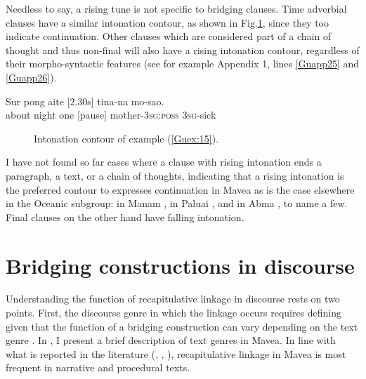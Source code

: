\documentclass[output=paper]{LSP/langsci}
\begin{document}
Needless to say, a rising tune is not specific to bridging clauses. Time adverbial clauses have a similar intonation contour, as shown in Fig.\ref{GuF5}, since they too indicate continuation. Other clauses which are considered part of a chain of thought and thus non-final will also have a rising intonation contour, regardless of their morpho-syntactic features (see for example Appendix 1, lines \ref{Guapp25} and \ref{Guapp26}). 

\begin{exe}
\ex \label{Guex:15}
\gll Sur     pong  aite [2.30s]   tina-na                mo-sao.\\     	       
about   night one      [pause]   mother-\textsc{3sg:poss}   \textsc{3sg}-sick \\
\glt {} 
\end{exe}


\begin{figure}[ht]
\caption{Intonation contour of example (\ref{Guex:15}). \label{GuF5}}
\end{figure}

I have not found so far cases where a clause with rising intonation ends a paragraph, a text, or a chain of thoughts, indicating that a rising intonation is the preferred contour to expresses continuation in Mavea as is the case elsewhere in the Oceanic subgroup: in Manam \citep[][521]{Lichtenberk83}, in Paluai \citep[][63]{Schokkin13}, and in Abma \citep[][38]{Schneider10}, to name a few. Final clauses on the other hand have falling intonation. 


\section{Bridging constructions in discourse} 
\label{Gusec:Understanding}
Understanding the function of recapitulative linkage in discourse rests on two points. First, the discourse genre in which the linkage occurs requires defining given that the function of a bridging construction can vary depending on the text genre \citep{devries.2005}. In , I present a brief description of text genres in Mavea. In line with what is reported in the literature (\citealt[][9]{longacre83},  \citealt[][365]{devries.2005}, \citealt[][274]{Thompson.et.al.2007}), recapitulative linkage in Mavea is most frequent in narrative and procedural texts.   
\end{document}
